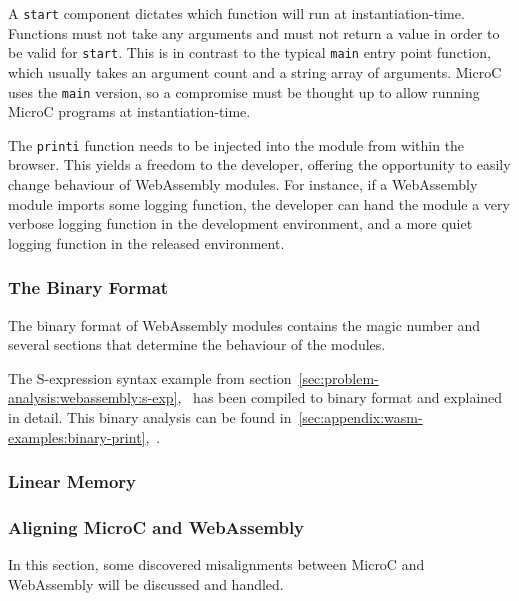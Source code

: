 \documentclass[a4paper]{article}
\begin{document}
A \texttt{start} component dictates which function will run at instantiation-time. Functions must not take any arguments and must not return a value in order to be valid for \texttt{start}. This is in contrast to the typical \texttt{main} entry point function, which usually takes an argument count and a string array of arguments. MicroC uses the \texttt{main} version, so a compromise must be thought up to allow running MicroC programs at instantiation-time.

The \texttt{printi} function needs to be injected into the module from within the browser. This yields a freedom to the developer, offering the opportunity to easily change behaviour of WebAssembly modules. For instance, if a WebAssembly module imports some logging function, the developer can hand the module a very verbose logging function in the development environment, and a more quiet logging function in the released environment.

\subsubsection{The Binary Format}
\label{sec:problem-analysis:webassembly:binary}
The binary format of WebAssembly modules contains the magic number and several sections that determine the behaviour of the modules.

The S-expression syntax example from section~\ref{sec:problem-analysis:webassembly:s-exp},~ has been compiled to binary format and explained in detail. This binary analysis can be found in~\ref{sec:appendix:wasm-examples:binary-print},~.

\subsubsection{Linear Memory}
\label{sec:problem-analysis-webassembly:linear-memory}

\subsubsection{Aligning MicroC and WebAssembly}
\label{sec:problem-analysis-webassembly:aligning}
In this section, some discovered misalignments between MicroC and WebAssembly will be discussed and handled.
\end{document}
